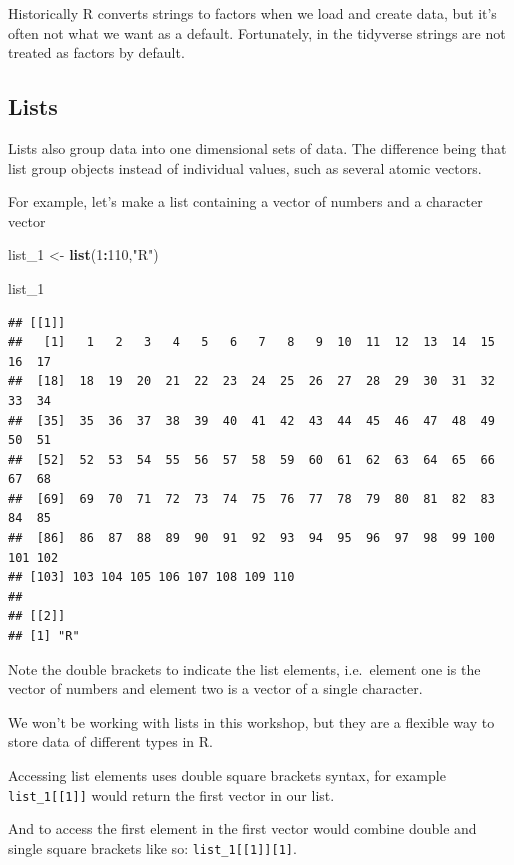 \documentclass[12pt,]{book}
\newenvironment{Shaded}{\begin{snugshade}}{\end{snugshade}}
\newcommand{\KeywordTok}[1]{\textcolor[rgb]{0.13,0.29,0.53}{\textbf{#1}}}
\newcommand{\DecValTok}[1]{\textcolor[rgb]{0.00,0.00,0.81}{#1}}
\newcommand{\StringTok}[1]{\textcolor[rgb]{0.31,0.60,0.02}{#1}}
\newcommand{\OperatorTok}[1]{\textcolor[rgb]{0.81,0.36,0.00}{\textbf{#1}}}
\newcommand{\NormalTok}[1]{#1}
\theoremstyle{definition}
\theoremstyle{definition}
\theoremstyle{definition}
\theoremstyle{remark}
\begin{document}
Historically R converts strings to factors when we load and create data,
but it's often not what we want as a default. Fortunately, in the
tidyverse strings are not treated as factors by default.

\subsection{Lists}\label{lists}

Lists also group data into one dimensional sets of data. The difference
being that list group objects instead of individual values, such as
several atomic vectors.

For example, let's make a list containing a vector of numbers and a
character vector

\begin{Shaded}
\begin{Highlighting}[]
\NormalTok{list_}\DecValTok{1}\NormalTok{ <-}\StringTok{ }\KeywordTok{list}\NormalTok{(}\DecValTok{1}\OperatorTok{:}\DecValTok{110}\NormalTok{,}\StringTok{"R"}\NormalTok{)}

\NormalTok{list_}\DecValTok{1}
\end{Highlighting}
\end{Shaded}

\begin{verbatim}
## [[1]]
##   [1]   1   2   3   4   5   6   7   8   9  10  11  12  13  14  15  16  17
##  [18]  18  19  20  21  22  23  24  25  26  27  28  29  30  31  32  33  34
##  [35]  35  36  37  38  39  40  41  42  43  44  45  46  47  48  49  50  51
##  [52]  52  53  54  55  56  57  58  59  60  61  62  63  64  65  66  67  68
##  [69]  69  70  71  72  73  74  75  76  77  78  79  80  81  82  83  84  85
##  [86]  86  87  88  89  90  91  92  93  94  95  96  97  98  99 100 101 102
## [103] 103 104 105 106 107 108 109 110
## 
## [[2]]
## [1] "R"
\end{verbatim}

Note the double brackets to indicate the list elements, i.e.~element one
is the vector of numbers and element two is a vector of a single
character.

We won't be working with lists in this workshop, but they are a flexible
way to store data of different types in R.

Accessing list elements uses double square brackets syntax, for example
\texttt{list\_1{[}{[}1{]}{]}} would return the first vector in our list.

And to access the first element in the first vector would combine double
and single square brackets like so:
\texttt{list\_1{[}{[}1{]}{]}{[}1{]}}.
\end{document}

